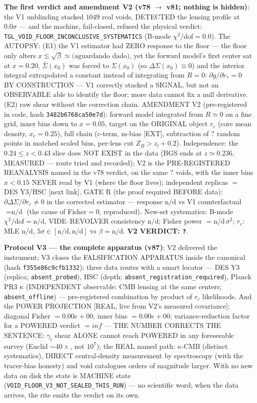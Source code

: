 \documentclass[11pt]{article}
\theoremstyle{definition}\newtheorem{deriv}{Derivation}
\begin{document}
\textbf{The first verdict and amendment V2 (v78 $\to$ v81; nothing is hidden)}: the V1 unblinding stacked $1049$ real voids, DETECTED the lensing profile at $0.0\sigma$ --- and the machine, fail-closed, refused the physical verdict: \texttt{TGL\_VOID\_FLOOR\_INCONCLUSIVE\_SYSTEMATICS} (B-mode $\chi^2/\mathrm{dof}=0.0$). The AUTOPSY: (E1) the V1 estimator had ZERO response to the floor --- the floor only alters $x\lesssim\sqrt{\beta}\simeq \text{(aguardando dado)}$, yet the forward model's first center sat at $x=0.20$, $\bar\Sigma(x_0)$ was forced to $\Sigma(x_0)$ (so $\Delta\Sigma(x_0)\equiv0$) and the interior integral extrapolated a constant instead of integrating from $R=0$: $\partial g/\partial r_*=0$ BY CONSTRUCTION --- V1 correctly stacked a SIGNAL, but not an OBSERVABLE able to identify the floor; more data cannot fix a null derivative. (E2) raw shear without the correction chain. AMENDMENT V2 (pre-registered in code, hash \texttt{3482b6768ca50e7d}): forward model integrated from $R\simeq0$ on a fine grid, inner bins down to $x=0.05$, target on the ORIGINAL object $r_c$ (core mean density, $x_c=0.25$), full chain (c-term, m-bias [EXT], subtraction of $?$ random points in matched scaled bins, per-lens cut $Z_B>z_l+0.2$). Independence: the $0.24\le z<0.43$ slice does NOT EXIST in the data (BGS ends at $z\simeq0.236$, MEASURED --- route tried and recorded); V2 is the PRE-REGISTERED REANALYSIS named in the v78 verdict, on the same $?$ voids, with the inner bins $x<0.15$ NEVER read by V1 (where the floor lives); independent replicas $=$ DES Y3/HSC [next link]. GATE R (the proof required BEFORE data): $\partial\Delta\Sigma/\partial r_c\neq0$ in the corrected estimator --- response $\text{n/d}$ vs V1 counterfactual $= \text{n/d}$ (the cause of Fisher$=0$, reproduced). New-set systematics: B-mode $\chi^2/\mathrm{dof}=\text{n/d}$, VIDE--REVOLVER consistency $\text{n/d}$; Fisher power $=\text{n/d}\,\sigma^2$; $r_c$: MLE $\text{n/d}$, $5\sigma\in[\text{n/d},\text{n/d}]$ vs $\beta=\text{n/d}$. \textbf{V2 VERDICT: \texttt{?}}.

\textbf{Protocol V3 --- the complete apparatus (v87)}: V2 delivered the instrument; V3 closes the FALSIFICATION APPARATUS inside the canonical (hash \texttt{f355e86c9cfb1332}): three data routes with a smart locator --- DES Y3 (replica; \texttt{absent\_probed}), HSC (depth; \texttt{absent\_registration\_required}), Planck PR3 $\kappa$ (INDEPENDENT observable: CMB lensing at the same centers; \texttt{absent\_offline}) --- pre-registered combination by product of $r_c$ likelihoods. And the POWER PROJECTION [REAL, live from V2's measured covariance]: diagonal Fisher $=0.00e+00$, inner bins $=0.00e+00$; variance-reduction factor for a POWERED verdict $=inf$ --- THE NUMBER CORRECTS THE SENTENCE: $\gamma_t$ shear ALONE cannot reach POWERED in any foreseeable survey (Euclid $\sim40\times$, not $10^7$); the REAL named path: $\kappa$-CMB (distinct systematics), DIRECT central-density measurement by spectroscopy (with the tracer-bias honesty) and void catalogues orders of magnitude larger. With no new data on disk the state is MACHINE state (\texttt{VOID\_FLOOR\_V3\_NOT\_SEALED\_THIS\_RUN}) --- no scientific word; when the data arrives, the rite emits the verdict on its own.
\end{document}
